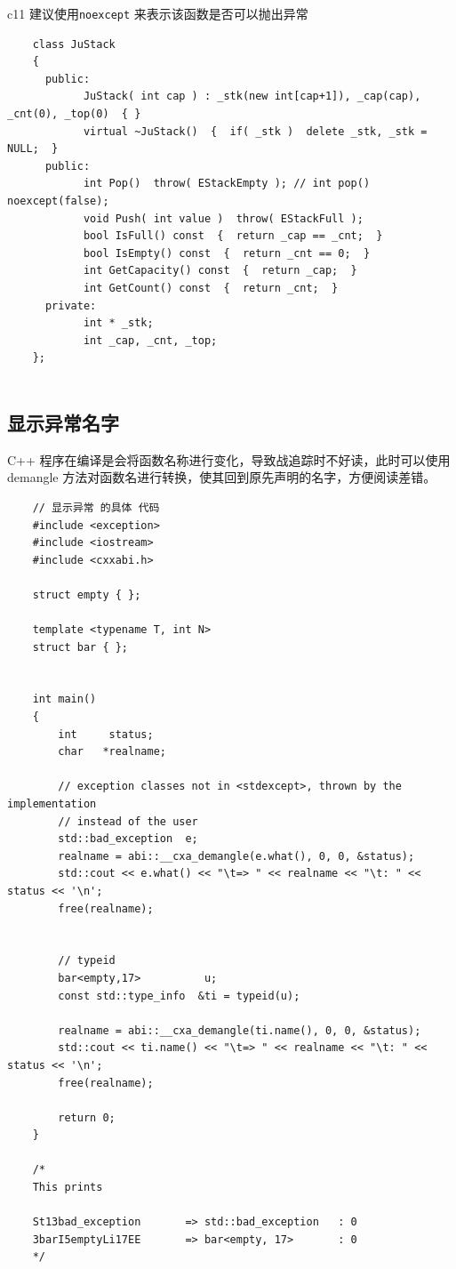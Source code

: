 \documentclass[UTF8,a4paper,12pt]{ctexbook}
\begin{document}
		c11 建议使用\verb|noexcept| 来表示该函数是否可以抛出异常	
			\begin{lstlisting}
	class JuStack
	{
	  public:
		    JuStack( int cap ) : _stk(new int[cap+1]), _cap(cap), _cnt(0), _top(0)  { }
		    virtual ~JuStack()  {  if( _stk )  delete _stk, _stk = NULL;  }
	  public:
		    int Pop()  throw( EStackEmpty ); // int pop() noexcept(false);
		    void Push( int value )  throw( EStackFull );
		    bool IsFull() const  {  return _cap == _cnt;  }
		    bool IsEmpty() const  {  return _cnt == 0;  }
		    int GetCapacity() const  {  return _cap;  }
		    int GetCount() const  {  return _cnt;  }
  	  private:
		    int * _stk;
		    int _cap, _cnt, _top;
	}; 
	
			\end{lstlisting}
	\subsection{显示异常名字}
		C++ 程序在编译是会将函数名称进行变化，导致战追踪时不好读，此时可以使用 demangle 方法对函数名进行转换，使其回到原先声明的名字，方便阅读差错。
		
\begin{lstlisting}
	// 显示异常 的具体 代码
	#include <exception>
	#include <iostream>
	#include <cxxabi.h>
	
	struct empty { };
	
	template <typename T, int N>
	struct bar { };
	
	
	int main()
	{
		int     status;
		char   *realname;
		
		// exception classes not in <stdexcept>, thrown by the implementation
		// instead of the user
		std::bad_exception  e;
		realname = abi::__cxa_demangle(e.what(), 0, 0, &status);
		std::cout << e.what() << "\t=> " << realname << "\t: " << status << '\n';
		free(realname);
		
		
		// typeid
		bar<empty,17>          u;
		const std::type_info  &ti = typeid(u);
		
		realname = abi::__cxa_demangle(ti.name(), 0, 0, &status);
		std::cout << ti.name() << "\t=> " << realname << "\t: " << status << '\n';
		free(realname);
		
		return 0;
	}
	
	/*
	This prints 
	
	St13bad_exception       => std::bad_exception   : 0
	3barI5emptyLi17EE       => bar<empty, 17>       : 0
	*/
	
\end{lstlisting}	
\end{document}
